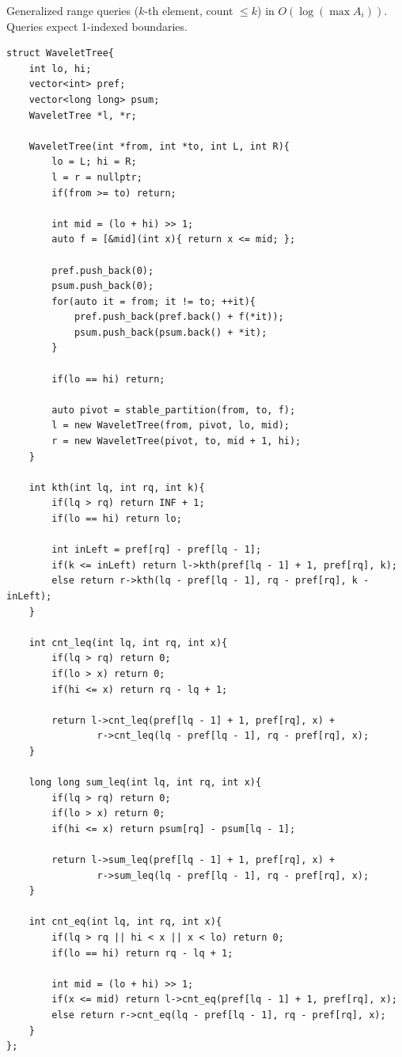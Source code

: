 
Generalized range queries ($k$-th element, count $\le k$) in $O(\log(\max A_i))$. Queries expect 1-indexed boundaries.

\begin{lstlisting}
struct WaveletTree{
    int lo, hi;
    vector<int> pref;
    vector<long long> psum;
    WaveletTree *l, *r;
 
    WaveletTree(int *from, int *to, int L, int R){
        lo = L; hi = R;
        l = r = nullptr;
        if(from >= to) return;
 
        int mid = (lo + hi) >> 1;
        auto f = [&mid](int x){ return x <= mid; };
 
        pref.push_back(0);
        psum.push_back(0);
        for(auto it = from; it != to; ++it){
            pref.push_back(pref.back() + f(*it));
            psum.push_back(psum.back() + *it);
        }
 
        if(lo == hi) return;
 
        auto pivot = stable_partition(from, to, f);
        l = new WaveletTree(from, pivot, lo, mid);
        r = new WaveletTree(pivot, to, mid + 1, hi);
    }
 
    int kth(int lq, int rq, int k){
        if(lq > rq) return INF + 1;
        if(lo == hi) return lo;
 
        int inLeft = pref[rq] - pref[lq - 1];
        if(k <= inLeft) return l->kth(pref[lq - 1] + 1, pref[rq], k);
        else return r->kth(lq - pref[lq - 1], rq - pref[rq], k - inLeft);
    }
 
    int cnt_leq(int lq, int rq, int x){
        if(lq > rq) return 0;
        if(lo > x) return 0;
        if(hi <= x) return rq - lq + 1;
 
        return l->cnt_leq(pref[lq - 1] + 1, pref[rq], x) +
                r->cnt_leq(lq - pref[lq - 1], rq - pref[rq], x);
    }
 
    long long sum_leq(int lq, int rq, int x){
        if(lq > rq) return 0;
        if(lo > x) return 0;
        if(hi <= x) return psum[rq] - psum[lq - 1];
 
        return l->sum_leq(pref[lq - 1] + 1, pref[rq], x) +
                r->sum_leq(lq - pref[lq - 1], rq - pref[rq], x);
    }
 
    int cnt_eq(int lq, int rq, int x){
        if(lq > rq || hi < x || x < lo) return 0;
        if(lo == hi) return rq - lq + 1;
 
        int mid = (lo + hi) >> 1;
        if(x <= mid) return l->cnt_eq(pref[lq - 1] + 1, pref[rq], x);
        else return r->cnt_eq(lq - pref[lq - 1], rq - pref[rq], x);
    }
};
\end{lstlisting}
